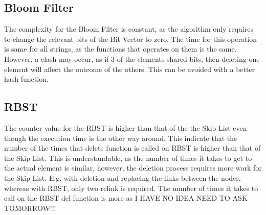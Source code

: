 \documentclass[11pt]{article}
\begin{document}
\subsection*{Bloom Filter}
The complexity for the Bloom Filter is constant, as the algorithm only requires to change the relevant bits of the Bit Vector to zero. The time for this operation is same for all strings, as the functions that operates on them is the same. However, a clash may occur, as if 3 of the elements shared bits, then deleting one element will affect the outcome of the others. This can be avoided with a better hash function. 
\subsection*{RBST}
The counter value for the RBST is higher than that of the the Skip List even though the execution time is the other way around. This indicate that the number of the times that delete function is called on RBST is higher than that of the Skip List. This is understandable, as the number of times it takes to get to the actual element is similar, however, the deletion process requires more work for the Skip List. E.g. with deletion and replacing the links between the nodes, whereas with RBST, only two relink is required. The number of times it takes to call on the RBST del function is more as I HAVE NO IDEA NEED TO ASK TOMORROW!!!
\end{document}
